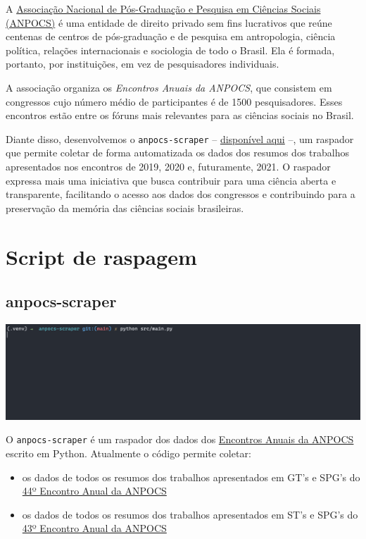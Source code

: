 \documentclass[
]{book}
\begin{document}
A \href{http://anpocs.com/}{Associação Nacional de Pós-Graduação e Pesquisa em Ciências Sociais (ANPOCS)} é uma entidade de direito privado sem fins lucrativos que reúne centenas de centros de pós-graduação e de pesquisa em antropologia, ciência política, relações internacionais e sociologia de todo o Brasil. Ela é formada, portanto, por instituições, em vez de pesquisadores individuais.

A associação organiza os \emph{Encontros Anuais da ANPOCS}, que consistem em congressos cujo número médio de participantes é de 1500 pesquisadores. Esses encontros estão entre os fóruns mais relevantes para as ciências sociais no Brasil.

Diante disso, desenvolvemos o \texttt{anpocs-scraper} -- \href{https://github.com/vmussa/anpocs-scraper}{disponível aqui} --, um raspador que permite coletar de forma automatizada os dados dos resumos dos trabalhos apresentados nos encontros de 2019, 2020 e, futuramente, 2021. O raspador expressa mais uma iniciativa que busca contribuir para uma ciência aberta e transparente, facilitando o acesso aos dados dos congressos e contribuindo para a preservação da memória das ciências sociais brasileiras.

\hypertarget{script-de-raspagem}{%
\section{Script de raspagem}\label{script-de-raspagem}}

\hypertarget{anpocs-scraper}{%
\subsection{anpocs-scraper}\label{anpocs-scraper}}

\includegraphics{img/demo.gif}

O \texttt{anpocs-scraper} é um raspador dos dados dos \href{http://anpocs.com/index.php/encontros/apresentacao}{Encontros Anuais da ANPOCS} escrito em Python. Atualmente o código permite coletar:

\begin{itemize}
\item
  os dados de todos os resumos dos trabalhos apresentados em GT's e SPG's do \href{https://www.anpocs2020.sinteseeventos.com.br/}{44º Encontro Anual da ANPOCS}
\item
  os dados de todos os resumos dos trabalhos apresentados em ST's e SPG's do \href{http://anpocs.com/index.php/43-encontro-anual-2019/2750-encontros-anuais/43-encontro/2301-resumos-sts-e-spgs}{43º Encontro Anual da ANPOCS}
\end{itemize}
\end{document}
